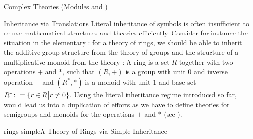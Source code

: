 \begin{tchapter}[id=complex-theories,short=Complex Theories]{Complex Theories (Modules
    {} and {})}
\begin{tsection}[id=morphisms]{Inheritance via Translations}
  Literal inheritance of symbols is often insufficient to re-use mathematical structures
  and theories efficiently. Consider for instance the situation in the elementary
  {}: for a theory of rings, we should be able to inherit
  the additive group structure from the theory {} of groups and the
  structure of a multiplicative monoid from the theory {}: A ring is a set
  $R$ together with two operations $+$ and $*$, such that $(R,+)$ is a group with unit $0$
  and inverse operation $-$ and $(R^*,*)$ is a monoid with unit $1$ and base set
  $R^*\colon=\{r\in R\bigl|r\ne 0\}$.  Using the literal inheritance regime introduced so
  far, would lead us into a duplication of efforts as we have to define theories for
  semigroups and monoids for the operations $+$ and $*$ (see {}).
\begin{myfig}{rings-simple}{A Theory of Rings via Simple Inheritance}
\end{myfig}
\end{tsection}
\end{tchapter}
